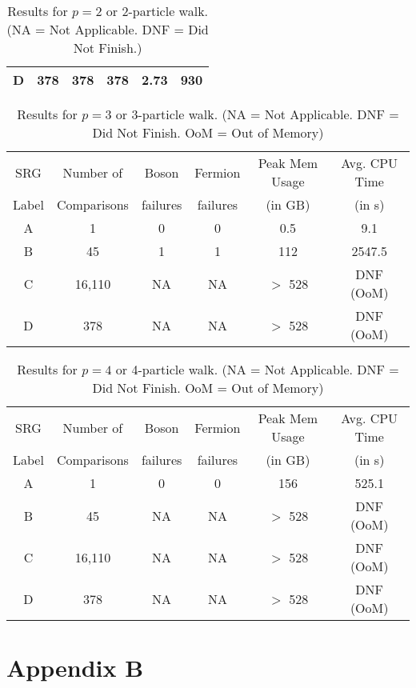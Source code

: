 \documentclass[twocolumn,a4paper,english,10pt]{article}
\begin{document}
{\begin{table}[H]
\begin{tabular}{c|c|c|c|c|c}
        D & 378 & 378 & 378 & 2.73 & 930 \\
        \hline\hline
    \end{tabular}
    \caption{Results for $p = 2$ or 2-particle walk. (NA = Not Applicable. DNF = Did Not Finish.)}
\end{table}
\begin{table}[H]
    \centering
    \begin{tabular}{c|c|c|c|c|c}
        \hline\hline
        SRG & Number of & Boson & Fermion & Peak Mem Usage & Avg. CPU Time \\
        Label & Comparisons & failures & failures & (in GB) & (in s) \\
        \hline
        A & 1 & 0 & 0 & 0.5	& 9.1 \\
        B & 45 & 1 & 1 & 112 & 2547.5 \\
        C & 16,110 & NA & NA & $>$ 528 & DNF (OoM) \\
        D & 378 & NA & NA & $>$ 528 & DNF (OoM) \\
        \hline\hline
    \end{tabular}
    \caption{Results for $p = 3$ or 3-particle walk. (NA = Not Applicable. DNF = Did Not Finish. OoM = Out of Memory)}
\end{table}
\begin{table}[H]
\centering
\begin{tabular}{c|c|c|c|c|c}
    \hline\hline
    SRG & Number of & Boson & Fermion & Peak Mem Usage & Avg. CPU Time \\
    Label & Comparisons & failures & failures & (in GB) & (in s) \\
    \hline
    A & 1 & 0 & 0 & 156 & 525.1 \\
    B & 45 & NA & NA & $>$ 528 & DNF (OoM) \\
    C & 16,110 & NA & NA & $>$ 528 & DNF (OoM) \\
    D & 378 & NA & NA & $>$ 528 & DNF (OoM) \\
    \hline\hline
\end{tabular}
\caption{Results for $p = 4$ or 4-particle walk. (NA = Not Applicable. DNF = Did Not Finish. OoM = Out of Memory)}
\end{table}

\newpage
\section*{Appendix B}
\printbibliography
}
\end{document}
